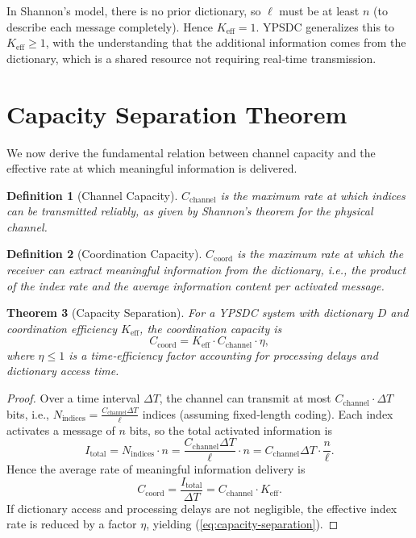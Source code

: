\documentclass[12pt,a4paper]{article}
\newtheorem{theorem}{Theorem}[section]
\newtheorem{definition}[theorem]{Definition}
\theoremstyle{remark}
\newcommand{\Keff}{K_{\mathrm{eff}}}
\begin{document}
	In Shannon's model, there is no prior dictionary, so $\ell$ must be at least $n$ (to describe each message completely). Hence $\Keff = 1$. YPSDC generalizes this to $\Keff \ge 1$, with the understanding that the additional information comes from the dictionary, which is a shared resource not requiring real‑time transmission.
	
	\section{Capacity Separation Theorem}
	\label{sec:separation}
	
	We now derive the fundamental relation between channel capacity and the effective rate at which meaningful information is delivered.
	
	\begin{definition}[Channel Capacity]
		$C_{\text{channel}}$ is the maximum rate at which indices can be transmitted reliably, as given by Shannon's theorem for the physical channel.
	\end{definition}
	
	\begin{definition}[Coordination Capacity]
		$C_{\text{coord}}$ is the maximum rate at which the receiver can extract meaningful information from the dictionary, i.e., the product of the index rate and the average information content per activated message.
	\end{definition}
	
	\begin{theorem}[Capacity Separation]
		For a YPSDC system with dictionary $D$ and coordination efficiency $\Keff$, the coordination capacity is
		\begin{equation}
			C_{\text{coord}} = \Keff \cdot C_{\text{channel}} \cdot \eta,
			\label{eq:capacity-separation}
		\end{equation}
		where $\eta \le 1$ is a time‑efficiency factor accounting for processing delays and dictionary access time.
	\end{theorem}
	
	\begin{proof}
		Over a time interval $\Delta T$, the channel can transmit at most $C_{\text{channel}} \cdot \Delta T$ bits, i.e., $N_{\text{indices}} = \frac{C_{\text{channel}} \Delta T}{\ell}$ indices (assuming fixed‑length coding). Each index activates a message of $n$ bits, so the total activated information is
		\[
		I_{\text{total}} = N_{\text{indices}} \cdot n = \frac{C_{\text{channel}} \Delta T}{\ell} \cdot n = C_{\text{channel}} \Delta T \cdot \frac{n}{\ell}.
		\]
		Hence the average rate of meaningful information delivery is
		\[
		C_{\text{coord}} = \frac{I_{\text{total}}}{\Delta T} = C_{\text{channel}} \cdot \Keff.
		\]
		If dictionary access and processing delays are not negligible, the effective index rate is reduced by a factor $\eta$, yielding (\ref{eq:capacity-separation}).
	\end{proof}
	
\end{document}
